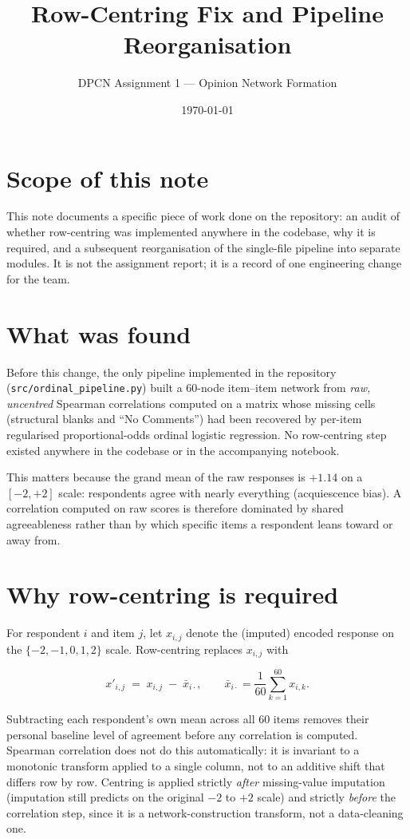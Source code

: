 \documentclass[11pt]{article}
\title{Row-Centring Fix and Pipeline Reorganisation}
\author{DPCN Assignment 1 --- Opinion Network Formation}
\date{\today}
\begin{document}
\maketitle

\section{Scope of this note}

This note documents a specific piece of work done on the repository: an audit
of whether row-centring was implemented anywhere in the codebase, why it is
required, and a subsequent reorganisation of the single-file pipeline into
separate modules. It is not the assignment report; it is a record of one
engineering change for the team.

\section{What was found}

Before this change, the only pipeline implemented in the repository
(\texttt{src/ordinal\_pipeline.py}) built a 60-node item--item network from
\emph{raw, uncentred} Spearman correlations computed on a matrix whose missing
cells (structural blanks and ``No Comments'') had been recovered by per-item
regularised proportional-odds ordinal logistic regression. No row-centring
step existed anywhere in the codebase or in the accompanying notebook.

This matters because the grand mean of the raw responses is $+1.14$ on a
$[-2, +2]$ scale: respondents agree with nearly everything (acquiescence
bias). A correlation computed on raw scores is therefore dominated by shared
agreeableness rather than by which specific items a respondent leans toward
or away from.

\section{Why row-centring is required}

For respondent $i$ and item $j$, let $x_{i,j}$ denote the (imputed) encoded
response on the $\{-2,-1,0,1,2\}$ scale. Row-centring replaces $x_{i,j}$ with

\begin{equation}
x'_{i,j} \;=\; x_{i,j} \;-\; \bar{x}_{i\cdot}, \qquad
\bar{x}_{i\cdot} = \frac{1}{60}\sum_{k=1}^{60} x_{i,k}.
\end{equation}

Subtracting each respondent's own mean across all 60 items removes their
personal baseline level of agreement before any correlation is computed.
Spearman correlation does not do this automatically: it is invariant to a
monotonic transform applied to a single column, not to an additive shift that
differs row by row. Centring is applied strictly \emph{after} missing-value
imputation (imputation still predicts on the original $-2$ to $+2$ scale) and
strictly \emph{before} the correlation step, since it is a network-construction
transform, not a data-cleaning one.
\end{document}

